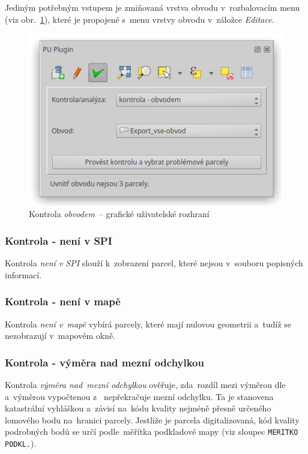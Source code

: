 Jediným potřebným vstupem je zmiňovaná vrstva obvodu v~rozbalovacím menu (viz obr.~\ref{fig:manual_kontrola_obvodem_gui}), které je propojené s~menu vrstvy obvodu v~záložce \textit{Editace}.

	\begin{figure}[H]
		\centering
		\includegraphics[width=.55\textwidth]{./pictures/kontrola-obvodem.png}
		\caption[Kontrola \textit{obvodem}~– grafické uživatelské rozhraní]{Kontrola \textit{obvodem}~– grafické uživatelské rozhraní}
		\label{fig:manual_kontrola_obvodem_gui}
 	\end{figure}

\subsubsection{Kontrola - není v SPI}
\label{manual_kontrola_neni_v_spi}

Kontrola \textit{není v SPI} slouží k~zobrazení parcel, které nejsou v~souboru popisných informací.

\subsubsection{Kontrola - není v mapě}
\label{manual_kontrola_neni_v_mape}

Kontrola \textit{není v~mapě} vybírá parcely, které mají nulovou geometrii a~tudíž se nezobrazují v~mapovém okně.

\subsubsection{Kontrola - výměra nad mezní odchylkou}
\label{manual_kontrola_vymera}

Kontrola \textit{výměra nad~mezní odchylkou} ověřuje, zda~rozdíl mezi výměrou dle~ a~výměrou vypočtenou z~ nepřekračuje mezní odchylku. Ta je stanovena katastrální vyhláškou a~závisí na~kódu kvality nejméně přesně určeného lomového bodu na~hranici parcely. Jestliže je parcela digitalizovaná, kód kvality podrobných bodů se určí podle~měřítka podkladové mapy (viz sloupec \texttt{MERITKO PODKL.}).

